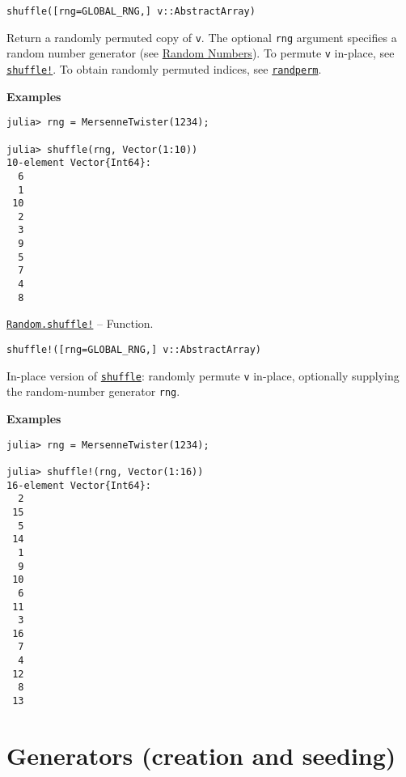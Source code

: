 \begin{adjustwidth}{2em}{0pt}


\begin{verbatim}
shuffle([rng=GLOBAL_RNG,] v::AbstractArray)
\end{verbatim}

Return a randomly permuted copy of \texttt{v}. The optional \texttt{rng} argument specifies a random number generator (see \href{@ref}{Random Numbers}). To permute \texttt{v} in-place, see \hyperlink{15315300334019616632}{\texttt{shuffle!}}. To obtain randomly permuted indices, see \hyperlink{7342203624124611352}{\texttt{randperm}}.

\textbf{Examples}


\begin{verbatim}
julia> rng = MersenneTwister(1234);

julia> shuffle(rng, Vector(1:10))
10-element Vector{Int64}:
  6
  1
 10
  2
  3
  9
  5
  7
  4
  8
\end{verbatim}



\end{adjustwidth}
\hypertarget{15315300334019616632}{}
\hyperlink{15315300334019616632}{\texttt{Random.shuffle!}}  -- {Function.}

\begin{adjustwidth}{2em}{0pt}


\begin{verbatim}
shuffle!([rng=GLOBAL_RNG,] v::AbstractArray)
\end{verbatim}

In-place version of \hyperlink{16742615893822221762}{\texttt{shuffle}}: randomly permute \texttt{v} in-place, optionally supplying the random-number generator \texttt{rng}.

\textbf{Examples}


\begin{verbatim}
julia> rng = MersenneTwister(1234);

julia> shuffle!(rng, Vector(1:16))
16-element Vector{Int64}:
  2
 15
  5
 14
  1
  9
 10
  6
 11
  3
 16
  7
  4
 12
  8
 13
\end{verbatim}



\end{adjustwidth}

\hypertarget{16600936393177391619}{}


\section{Generators (creation and seeding)}



